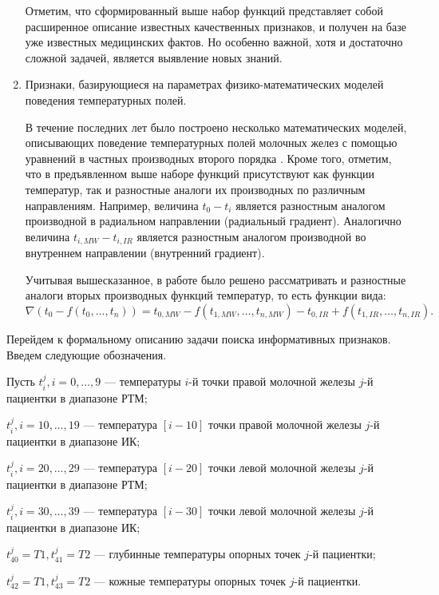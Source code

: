 \begin{enumerate}
        Отметим, что сформированный выше набор функций представляет собой расширенное описание известных качественных признаков, и получен на базе уже известных медицинских фактов. Но особенно важной, хотя и достаточно сложной задачей, является выявление новых знаний.

    \item Признаки, базирующиеся на параметрах физико-математических моделей поведения температурных полей.

    В течение последних лет было построено несколько математических моделей,
    описывающих поведение температурных полей молочных желез с помощью уравнений в
    частных производных второго порядка \cite{losevhoperskov, polhop1}.
    Кроме того, отметим, что в предъявленном выше наборе функций присутствуют как функции
    температур, так и разностные аналоги их производных по различным направлениям.
    Например, величина \(t_{0} - t_{i}\) является разностным аналогом производной в
    радиальном направлении (радиальный градиент). Аналогично
    величина \(t_{i, MW} - t_{i, IR}\) является разностным аналогом производной во внутреннем
    направлении (внутренний градиент).

    Учитывая вышесказанное, в работе было решено рассматривать и разностные аналоги вторых производных функций температур, то есть функции вида:
    \[\nabla(t_{0} - f(t_{0}, \dots, t_{n})) = t_{0, MW} - f(t_{1, MW}, \dots, t_{n, MW}) -
    t_{0, IR} + f(t_{1, IR}, \dots, t_{n, IR}). \]
\end{enumerate}

Перейдем к формальному описанию задачи поиска информативных
признаков. Введем следующие обозначения.

Пусть \(t_{i}^{j}, i = 0, \dots, 9\) --- температуры $i$-й точки правой молочной железы $j$-й пациентки в диапазоне РТМ;

\(t_{i}^{j}, i = 10, \dots, 19\) --- температура \([i - 10]\) точки правой молочной железы $j$-й пациентки в диапазоне ИК;

\(t_{i}^{j}, i = 20, \dots, 29\) --- температура \([i - 20]\) точки левой молочной железы $j$-й пациентки в диапазоне РТМ;

\(t_{i}^{j}, i = 30, \dots, 39\) --- температура \([i - 30]\) точки левой молочной железы $j$-й пациентки в диапазоне ИК;

\(t_{40}^{j} = T1, t_{41}^{j} = T2\) --- глубинные температуры опорных точек $j$-й пациентки;

\(t_{42}^{j} = T1, t_{43}^{j} = T2\) --- кожные температуры опорных точек $j$-й пациентки.

